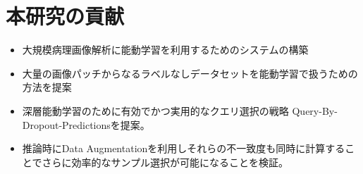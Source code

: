 \section{本研究の貢献}
\begin{itemize}
    \item 大規模病理画像解析に能動学習を利用するためのシステムの構築
    \item 大量の画像パッチからなるラベルなしデータセットを能動学習で扱うための方法を提案
    \item 深層能動学習のために有効でかつ実用的なクエリ選択の戦略 Query-By-Dropout-Predictionsを提案。
    \item 推論時にData Augmentationを利用しそれらの不一致度も同時に計算することでさらに効率的なサンプル選択が可能になることを検証。
\end{itemize}
